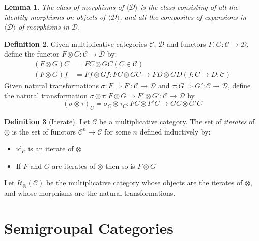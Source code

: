 \documentclass{book}
\newtheorem{lm}{Lemma}[chapter]
\theoremstyle{definition}
\newtheorem{df}[lm]{Definition}
\newcommand{\id}[1]{\ensuremath{\mathrm{id}_{#1}}}
\begin{document}
  \begin{lm}
    The class of morphisms of $\langle \mathcal{D} \rangle$ is the class 
    consisting of all the identity morphisms on objects of $\langle \mathcal{D} 
    \rangle$, and all the composites of expansions in $\langle \mathcal{D} 
    \rangle$ 
    of morphisms in $\mathcal{D}$.
  \end{lm}
  
  \begin{df}
    Given multiplicative categories $\mathcal{C}$, $\mathcal{D}$ and functors 
    $F, 
    G : \mathcal{C} \rightarrow \mathcal{D}$, define the functor $F \otimes G : 
    \mathcal{C} \rightarrow \mathcal{D}$ by:
    \begin{align*}
      (F \otimes G) C & = FC \otimes GC (C \in \mathcal{C}) \\
      (F \otimes G) f & = Ff \otimes Gf : FC \otimes GC \rightarrow FD \otimes 
      GD (f 
      : C \rightarrow D : \mathcal{C})
    \end{align*}
    Given natural transformations $\sigma : F \Rightarrow F' : \mathcal{C} 
    \rightarrow \mathcal{D}$ and $\tau : G \Rightarrow G' : \mathcal{C} 
    \rightarrow 
    \mathcal{D}$, define the natural transformation $\sigma \otimes \tau : F 
    \otimes G \Rightarrow F' \otimes G' : \mathcal{C} \rightarrow \mathcal{D}$ 
    by
    \[ (\sigma \otimes \tau)_C = \sigma_C \otimes \tau_C : FC \otimes F'C 
    \rightarrow GC \otimes G'C \]
  \end{df}
  
  \begin{df}[Iterate]
    Let $\mathcal{C}$ be a multiplicative category. The set of \emph{iterates} 
    of 
    $\otimes$ is the set of functors $\mathcal{C}^n \rightarrow \mathcal{C}$ 
    for some $n$ defined inductively by:
    \begin{itemize}
      \item $\id{\mathcal{C}}$ is an iterate of $\otimes$
      \item If $F$ and $G$ are iterates of $\otimes$ then so is $F \otimes G$
    \end{itemize}
    
    Let $It_\otimes(\mathcal{C})$ be the multiplicative category whose objects 
    are 
    the iterates of $\otimes$, and whose morphisms are the natural 
    transformations.
  \end{df}
  
  \section{Semigroupal Categories}
  
\end{document}
